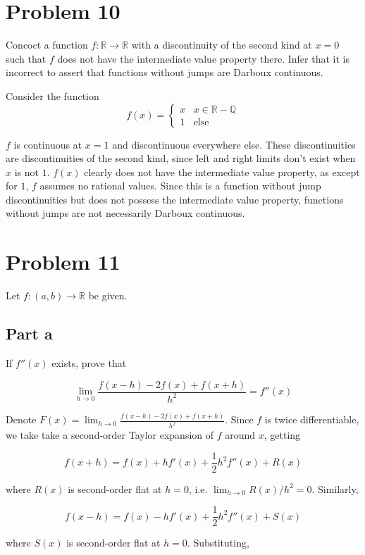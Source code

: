 \documentclass{article}
\newcommand{\R}{\mathbb{R}}
\newcommand{\Q}{\mathbb{Q}}
\begin{document}
\section*{Problem 10}

Concoct a function $f: \R \rightarrow \R$ with a discontinuity of the second kind at $x = 0$ such that $f$ does not have the intermediate value property there. Infer that it is incorrect to assert that functions without jumps are Darboux continuous.

Consider the function
\[
f(x) = 
\begin{cases}
x & x \in \R - \Q \\
1 & \text{else}
\end{cases}
\]

$f$ is continuous at $x=1$ and discontinuous everywhere else. These discontinuities are discontinuities of the second kind, since left and right limits don't exist when $x$ is not $1$. $f(x)$ clearly does not have the intermediate value property, as except for $1$, $f$ assumes no rational values. Since this is a function without jump discontinuities but does not possess the intermediate value property, functions without jumps are not necessarily Darboux continuous.

\section*{Problem 11}

Let $f: (a, b) \rightarrow \R$ be given.

\subsection*{Part a}

If $f''(x)$ exists, prove that

\[
\lim_{h \rightarrow 0} \frac{f(x-h) - 2f(x) + f(x+h)}{h^2} = f''(x)
\]

Denote $F(x) = \lim_{h \rightarrow 0} \frac{f(x-h) - 2f(x) + f(x+h)}{h^2}$. Since $f$ is twice differentiable, we take take a second-order Taylor expansion of $f$ around $x$, getting

\[
f(x+h) = f(x) + hf'(x) + \frac{1}{2} h^2 f''(x) + R(x)
\]

where $R(x)$ is second-order flat at $h = 0$, i.e. $\lim_{h \rightarrow 0} R(x)/h^2 = 0$. Similarly,

\[
f(x-h) = f(x) - hf'(x) + \frac{1}{2} h^2 f''(x) + S(x)
\]

where $S(x)$ is second-order flat at $h = 0$. Substituting,
\end{document}
